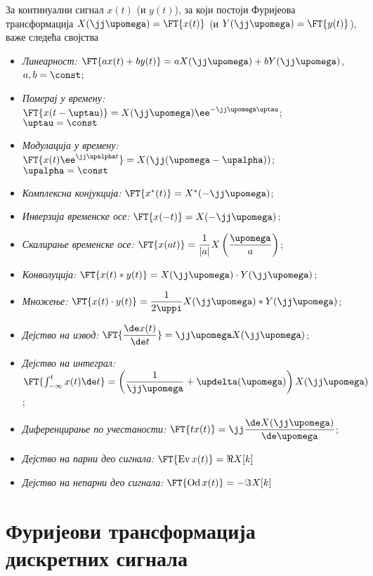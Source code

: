 За континуални сигнал $x(t)$ (и $y(t)$), за који постоји Фуријеова трансформација
$X(\jj\upomega) = \FT{x(t)}$ (и $Y(\jj\upomega) = \FT{y(t)}$), важе следећа својства
\begin{itemize}
    \item \emph{Линеарност:} $\FT{ax(t) + by(t)} = a X(\jj\upomega) + b Y(\jj\upomega)$, \qquad $a,b = \const$; \hfill \Svojstvo
    \item \emph{Померај у времену:} $\FT{x(t-\uptau)} = X(\jj\upomega) \ee^{-\jj\upomega \uptau}$; \qquad $\uptau = \const$ \hfill \Svojstvo
    \item \emph{Модулација у времену:} $\FT{x(t) \ee^{\jj\upalpha t}} = X(\jj(\upomega - \upalpha))$; \qquad $\upalpha = \const$ \hfill \Svojstvo
    \item \emph{Комплексна конјукција:} $\FT{x^{\ast}(t) } = X^{\ast}(-\jj\upomega)$;  \hfill \Svojstvo
    \item \emph{Инверзија временске осе:} $\FT{x(-t) } = X(-\jj\upomega)$;  \hfill \Svojstvo
    \item \emph{Скалирање временске осе:} $\FT{x(at)} = \dfrac{1}{|a|} X\left( \dfrac{\upomega}{a} \right)$; \hfill \Svojstvo
    \item \emph{Конволуција:} $\FT{x(t) \ast y(t)} = X(\jj\upomega) \cdot Y(\jj\upomega)$;  \hfill \Svojstvo
    \item \emph{Множење:} $\FT{x(t) \cdot y(t)} = \dfrac{1}{2\uppi} X(\jj\upomega) \ast Y(\jj\upomega)$; \hfill \Svojstvo
    \item \emph{Дејство на извод:} $ \FT{ \dfrac{ \de x(t)}{\de t}} = \jj\upomega X(\jj\upomega)$; \hfill \Svojstvo
    \item \emph{Дејство на интеграл:} $ \FT{ \int_{-\infty}^{t} x(t) \de t} =  
    \left( 
        \dfrac{1}{\jj\upomega} + \updelta(\upomega)
    \right) X(\jj\upomega)$; \hfill \Svojstvo
    \item \emph{Диференцирање по учестаности:} 
    $
    \FT{ t x(t) } = \jj \dfrac{\de X(\jj\upomega)}{\de \upomega}
    $; \hfill \Svojstvo
    \item \emph{Дејство на парни део сигнала:}
    $ 
    \FT{ \operatorname{Ev}x(t)} = \Re{X[k]}
    $ \hfill \Svojstvo
    \item \emph{Дејство на непарни део сигнала:}
    $
    \FT{ \operatorname{Od}x(t)} = -\Im{X[k]}
    $\hfill \Svojstvo
    
\end{itemize} 


\section*{Фуријеови трансформација дискретних сигнала}

